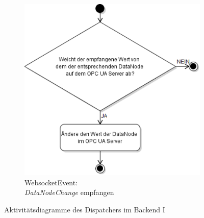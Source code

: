 \begin{figure}[ht]
\begin{subfigure}[b]{0.583656716\textwidth}
    \includegraphics[width=\textwidth]{content/hauptteil/systemEntwurf/res/wsHandler/backend/wsEvent_dataNodeChange.pdf}
    \caption{WebsocketEvent:\\\emph{DataNodeChange} empfangen}
    \label{fig:aDDB:wsEvent_dataNodeChange}
  \end{subfigure}

  \caption[Aktivitätsdiagramme Dispatcher Backend I]{Aktivitätsdiagramme des Dispatchers im Backend I}
  \label{fig:activityDiagramDispatcherBackendI}
\end{figure}

